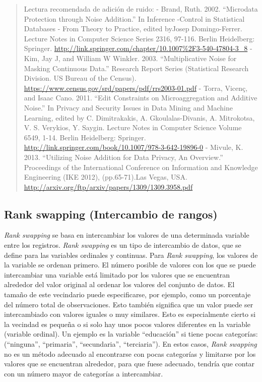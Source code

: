 \documentclass[
]{book}
\theoremstyle{definition}
\theoremstyle{definition}
\theoremstyle{definition}
\theoremstyle{definition}
\theoremstyle{remark}
\begin{document}
\begin{quote}
Lectura recomendada de adición de ruido:
- Brand, Ruth. 2002. ``Microdata Protection through Noise Addition.'' In Inference -Control in Statistical Databases - From Theory to Practice, edited byJosep Domingo-Ferrer. Lecture Notes in Computer Science Series 2316, 97-116. Berlin Heidelberg: Springer. \url{http://link.springer.com/chapter/10.1007\%2F3-540-47804-3_8}
- Kim, Jay J, and William W Winkler. 2003. ``Multiplicative Noise for Masking Continuous Data.'' Research Report Series (Statistical Research Division. US Bureau of the Census). \url{https://www.census.gov/srd/papers/pdf/rrs2003-01.pdf}
- Torra, Vicenç, and Isaac Cano. 2011. ``Edit Constraints on Microaggregation and Additive Noise.'' In Privacy and Security Issues in Data Mining and Machine Learning, edited by C. Dimitrakakis, A. Gkoulalas-Divanis, A. Mitrokotsa, V. S. Verykios, Y. Saygin. Lecture Notes in Computer Science Volume 6549, 1-14. Berlin Heidelberg: Springer. \url{http://link.springer.com/book/10.1007/978-3-642-19896-0}
- Mivule, K. 2013. ``Utilizing Noise Addition for Data Privacy, An Overview.'' Proceedings of the International Conference on Information and Knowledge Engineering (IKE 2012), (pp.65-71).Las Vegas, USA. \url{http://arxiv.org/ftp/arxiv/papers/1309/1309.3958.pdf}
\end{quote}

\hypertarget{rank-swapping-intercambio-de-rangos}{%
\subsection{Rank swapping (Intercambio de rangos)}\label{rank-swapping-intercambio-de-rangos}}

\emph{Rank swapping} se basa en intercambiar los valores de una determinada variable entre los registros. \emph{Rank swapping} es un tipo de intercambio de datos, que se define para las variables ordinales y continuas. Para \emph{Rank swapping}, los valores de la variable se ordenan primero. El número posible de valores con los que se puede intercambiar una variable está limitado por los valores que se encuentran alrededor del valor original al ordenar los valores del conjunto de datos. El tamaño de este vecindario puede especificarse, por ejemplo, como un porcentaje del número total de observaciones. Esto también significa que un valor puede ser intercambiado con valores iguales o muy similares. Esto es especialmente cierto si la vecindad es pequeña o si solo hay unos pocos valores diferentes en la variable (variable ordinal). Un ejemplo es la variable ``educación'' si tiene pocas categorías: (``ninguna'', ``primaria'', ``secundaria'', ``terciaria''). En estos casos, \emph{Rank swapping} no es un método adecuado al encontrarse con pocas categorías y limitarse por los valores que se encuentran alrededor, para que fuese adecuado, tendría que contar con un número mayor de categorías a intercambiar.
\end{document}
